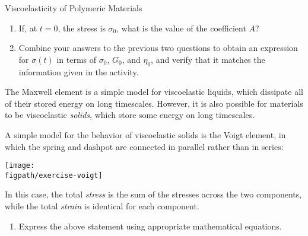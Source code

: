 \begin{activity}{Viscoelasticity of Polymeric Materials}
\begin{exercises}
\begin{enumerate}
				\item If, at $t=0$, the stress is $\sigma_0$, what is the value of the coefficient $A$?
				
					\begin{solution}\end{solution}
				
				\item Combine your answers to the previous two questions to obtain an expression for $\sigma(t)$ in terms of $\sigma_0$, $G_0$, and $\eta_0$, and verify that it matches the information given in the activity.
				
					\begin{solution}\end{solution}
			\end{enumerate}
		
		\exercise \label{\labelbase:exc:voigt} The Maxwell element is a simple model for viscoelastic liquids, which dissipate all of their stored energy on long timescales.  However, it is also possible for materials to be viscoelastic \emph{solids}, which store some energy on long timescales.
		
			A simple model for the behavior of viscoelastic solids is the Voigt element, in which the spring and dashpot are connected in parallel rather than in series:
		
			\vspace{3pt}
			\centerline{\texttt{[image: \\figpath/exercise-voigt]}}
			
			In this case, the total \emph{stress} is the sum of the stresses across the two components, while the total \emph{strain} is identical for each component.
			
			\begin{enumerate}
				\item Express the above statement using appropriate mathematical equations. 
				
					\begin{solution}
\end{solution}
\end{enumerate}
\end{exercises}
\end{activity}
